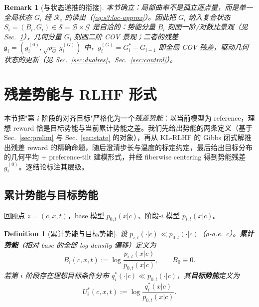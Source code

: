 \documentclass[11pt,a4paper]{article}
\newtheorem{definition}[theorem]{Definition}
\newtheorem{remark}[theorem]{Remark}
\newcommand{\cS}{\mathcal{S}}   %
\newcommand{\cG}{\mathcal{G}}   %
\newcommand{\cB}{\mathcal{B}}   %
\newcommand{\Rstr}{\mathcal{R}}     %
\newcommand{\gres}{\bm{\mathfrak{g}}} %
\begin{document}
\begin{remark}[与状态递推的衔接]\label{rem:s3:link}
本节确立：局部曲率不是孤立逐点量，而是单一全局状态 $G_i$ 经 $\Rstr_z$ 的读出（\eqref{eq:s3:loc-approx}）。因此把 $G_i$ 纳入复合状态 $S_i=(B_i,G_i)\in\cS=\cB\times\cG$ 是自洽的：势能分量 $B_i$ 刻画一阶/对数比景观（见 Sec.~\ref{sec:potential}），几何分量 $G_i$ 刻画二阶 COV 景观；二者的残差 $\gres_i=(g_i^{(0)},\sqrt{\rho_G}\,g_i^{(G)})$ 中，$g_i^{(G)}=G_i^*-G_{i-1}$ 即全局 COV 残差，驱动几何状态的更新（见 Sec.~\ref{sec:dualres}、Sec.~\ref{sec:control}）。
\end{remark}

\section{残差势能与 RLHF 形式}\label{sec:potential}

本节把"第 $i$ 阶段的对齐目标"严格化为一个\emph{残差势能}：以当前模型为 reference，理想 reward 恰是目标势能与当前累计势能之差。我们先给出势能的两条定义（基于 Sec.~\ref{sec:prelim} 与 Sec.~\ref{sec:state} 的对象），再从 KL-RLHF 的 Gibbs 闭式解推出残差 reward 的精确命题，随后澄清步长与温度的标定约定，最后给出目标分布的几何平均 $+$ preference-tilt 建模形式，并经 fiberwise centering 得到势能残差 $g_i^{(0)}$。逐结论标注其层级。

\subsection{累计势能与目标势能}

回顾点 $z=(c,x,t)$，base 模型 $p_{0,t}(x|c)$、阶段-$i$ 模型 $p_{i,t}(x|c)$。

\begin{definition}[累计势能与目标势能]\label{def:s4:potentials}
设 $p_{i,t}(\cdot|c)\ll p_{0,t}(\cdot|c)$（$\rho$-a.e.\ $c$）。\textbf{累计势能}（相对 base 的全部 log-density 偏移）定义为
\begin{equation}\label{eq:s4:Bdef}
B_i(c,x,t):=\log\frac{p_{i,t}(x|c)}{p_{0,t}(x|c)},\qquad B_0\equiv 0 .
\end{equation}
若第 $i$ 阶段存在理想目标条件分布 $q_i^*(\cdot|c)\ll p_{0,t}(\cdot|c)$，其\textbf{目标势能}定义为
\begin{equation}\label{eq:s4:Ustardef}
U_i^*(c,x,t):=\log\frac{q_i^*(x|c)}{p_{0,t}(x|c)} .
\end{equation}
\end{definition}
\end{document}
